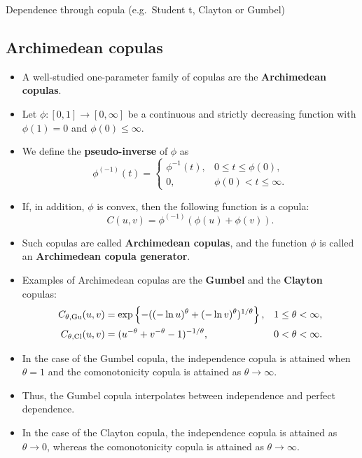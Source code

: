 
Dependence through copula (e.g.\ Student t, Clayton or Gumbel)

\subsection{Archimedean copulas}
\label{sec:archimedean-copulas}

\begin{itemize}
\item A well-studied one-parameter family of copulas are the {\bf 
    Archimedean copulas}. 
\item Let $\phi:[0,1]\rightarrow[0,\infty]$ be a
  continuous and strictly decreasing function with $\phi(1)=0$ and
  $\phi(0)\leq\infty$.
\item  We define the {\bf pseudo-inverse} of $\phi$ as 
  \begin{equation*}
    \phi^{(-1)}(t)=
    \begin{cases}
      \phi^{-1}(t), &0\leq t\leq \phi(0),\\
      0, &\phi(0)<t\leq\infty.
    \end{cases}
  \end{equation*}
\item If, in addition, $\phi$ is convex, then the following function
  is a copula: 
  \begin{equation*}
    C(u,v)=\phi^{(-1)}(\phi(u)+\phi(v)).
  \end{equation*}
  \vspace*{-\baselineskip}
\item Such copulas are called {\bf Archimedean copulas}, and the
  function $\phi$ is called an {\bf Archimedean copula generator}. 
\item Examples of Archimedean copulas are the {\bf Gumbel} and the
  {\bf Clayton} copulas:
  \begin{align*}
    C_{\theta,{\rm Gu}}(u,v) &= \exp\left\{-((-\ln u)^\theta + (-\ln
                               v)^\theta)^{1/\theta}\right\},& 1\leq \theta<\infty,\\
    C_{\theta,{\rm Cl}}(u,v)&= (u^{-\theta} + v^{-\theta}
                              -1)^{-1/\theta}, & 0<\theta<\infty. 
  \end{align*}
\item In the case of the Gumbel copula, the independence copula is 
  attained when $\theta=1$ and the comonotonicity copula is attained
  as $\theta\rightarrow\infty$. 
\item Thus, the Gumbel copula interpolates between independence and
  perfect dependence.  
\item In the case of the Clayton copula, the independence copula is
  attained as $\theta\rightarrow 0$, whereas the comonotonicity
  copula is attained as $\theta\rightarrow\infty$. 
\end{itemize}


